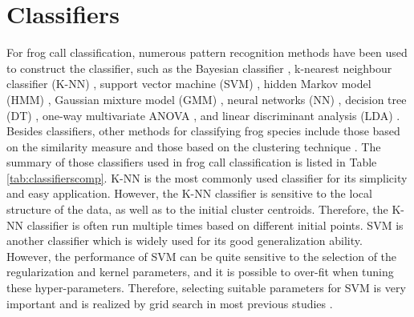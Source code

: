 \section{Classifiers}
\label{classifiers}
For frog call classification, numerous pattern recognition methods have been used to construct the classifier, such as the Bayesian classifier \citep{Brandes2006}, k-nearest neighbour classifier (K-NN) \citep{ huang2008realization,huang2009frog, han2011acoustic, dayou2011classification, jaafar2013, Gingras2013, jaafar2013mfcc,jaafarcomparative, yuan2012frog, vaca2010using, feature2012Colona}, support vector machine (SVM) \citep{huang2008realization,acevedo2009automated, huang2009frog, tanintelligent2014, Gingras2013,jaafarcomparative}, hidden Markov model (HMM) \citep{brandes2008feature}, Gaussian mixture model (GMM) \citep{huang2008realization, Gingras2013}, neural networks (NN) \citep{Huang20141, yen2002automatic}, decision tree (DT) \citep{grigg1996monitoring, acevedo2009automated}, one-way multivariate ANOVA \citep{camacho2013automatic}, and linear discriminant analysis (LDA) \citep{acevedo2009automated,lee2006automatic}.  Besides classifiers, other methods for classifying frog species include those based on the similarity measure \citep{croker2012using, dang2008lightweight, chen2012automatic} and those based on the clustering technique \citep{colombia2009frogs, wei2012distributed, bedoya2014automatic}. The summary of those classifiers used in frog call classification is listed in Table \ref{tab:classifierscomp}.
K-NN is the most commonly used classifier for its simplicity and easy application. However, the K-NN classifier is sensitive to the local structure of the data, as well as to the initial cluster centroids. Therefore, the K-NN classifier is often run multiple times based on different initial points. 
SVM is another classifier which is widely used for its good generalization ability. However, the performance of SVM can be quite sensitive to the selection of the regularization and kernel parameters, and it is possible to over-fit when tuning these hyper-parameters. Therefore, selecting suitable parameters for SVM is very important and is realized by grid search in most previous studies \citep{hsu2003practical}.

